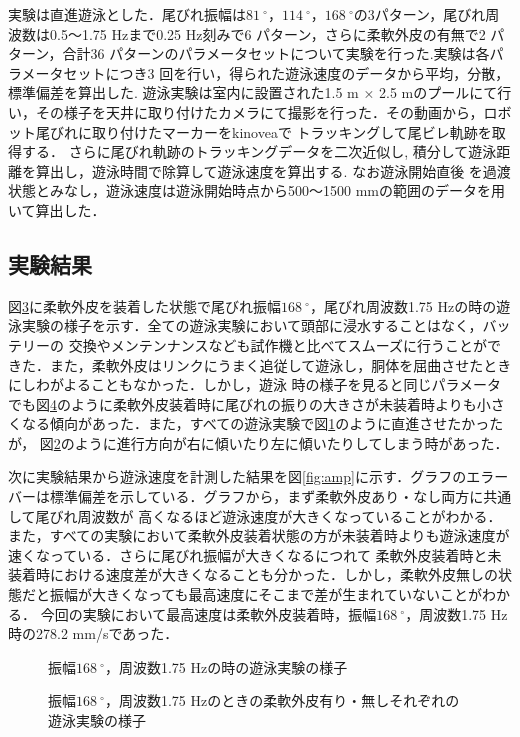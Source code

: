 実験は直進遊泳とした．尾びれ振幅は$81\:^\circ$，$114\:^\circ$，$168\:^\circ$の3パターン，尾びれ周波数は0.5～1.75 Hzまで0.25 Hz刻みで6 パターン，さらに柔軟外皮の有無で2 パターン，合計36 
パターンのパラメータセットについて実験を行った.実験は各パラメータセットにつき3 回を行い，得られた遊泳速度のデータから平均，分散，標準偏差を算出した.
遊泳実験は室内に設置された1.5 m × 2.5 mのプールにて行い，その様子を天井に取り付けたカメラにて撮影を行った．その動画から，ロボット尾びれに取り付けたマーカーをkinoveaで
トラッキングして尾ビレ軌跡を取得する．
さらに尾びれ軌跡のトラッキングデータを二次近似し, 積分して遊泳距離を算出し，遊泳時間で除算して遊泳速度を算出する. なお遊泳開始直後
を過渡状態とみなし，遊泳速度は遊泳開始時点から500～1500 mmの範囲のデータを用いて算出した．

\subsection{実験結果}
図\ref{fig:test_swim}に柔軟外皮を装着した状態で尾びれ振幅$168\:^\circ$，尾びれ周波数1.75 Hzの時の遊泳実験の様子を示す．全ての遊泳実験において頭部に浸水することはなく，バッテリーの
交換やメンテンナンスなども試作機と比べてスムーズに行うことができた．また，柔軟外皮はリンクにうまく追従して遊泳し，胴体を屈曲させたときにしわがよることもなかった．しかし，遊泳
時の様子を見ると同じパラメータでも図\ref{fig:kukkyoku}のように柔軟外皮装着時に尾びれの振りの大きさが未装着時よりも小さくなる傾向があった．また，すべての遊泳実験で図\ref{fig:str}のように直進させたかったが，
図\ref{fig:right}のように進行方向が右に傾いたり左に傾いたりしてしまう時があった．

次に実験結果から遊泳速度を計測した結果を図\ref{fig:amp}に示す．グラフのエラーバーは標準偏差を示している．グラフから，まず柔軟外皮あり・なし両方に共通して尾びれ周波数が
高くなるほど遊泳速度が大きくなっていることがわかる．また，すべての実験において柔軟外皮装着状態の方が未装着時よりも遊泳速度が速くなっている．さらに尾びれ振幅が大きくなるにつれて
柔軟外皮装着時と未装着時における速度差が大きくなることも分かった．しかし，柔軟外皮無しの状態だと振幅が大きくなっても最高速度にそこまで差が生まれていないことがわかる．
今回の実験において最高速度は柔軟外皮装着時，振幅$168\:^\circ$，周波数1.75 Hz時の278.2 mm/sであった．

\begin{figure}[htbp]
   \centering  
   \begin{subfigure}[b]{1\linewidth}
       \centering
       \label{fig:str}
   \end{subfigure}
   \begin{subfigure}[b]{1\linewidth}
       \centering
       \label{fig:right}
   \end{subfigure}
   \caption{振幅$168\:^\circ$，周波数1.75 Hzの時の遊泳実験の様子}
   \label{fig:test_swim}
\end{figure}
\begin{figure}[htbp]
    \centering
    \caption{振幅$168\:^\circ$，周波数1.75 Hzのときの柔軟外皮有り・無しそれぞれの遊泳実験の様子}
    \label{fig:kukkyoku}
\end{figure}

